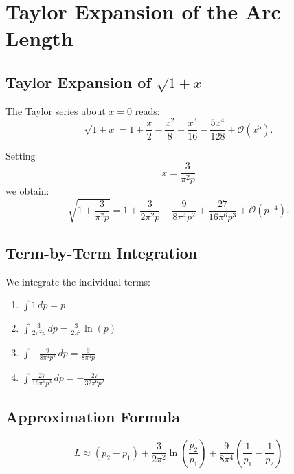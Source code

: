 \chapter{Taylor Expansion of the Arc Length}\label{ch:taylor}


\section{Taylor Expansion of \texorpdfstring{$\sqrt{1+x}$}{sqrt(1+x)}}

The Taylor series about $x=0$ reads:
\begin{equation}
\sqrt{1+x}
= 1 + \frac{x}{2} - \frac{x^2}{8} + \frac{x^3}{16}
  - \frac{5x^4}{128} + \mathcal{O}(x^5).
\end{equation}

Setting
\[
x = \frac{3}{\pi^2 p}
\]
we obtain:
\begin{equation}
\sqrt{1 + \frac{3}{\pi^2 p}}
= 1
+ \frac{3}{2\pi^2 p}
- \frac{9}{8\pi^4 p^2}
+ \frac{27}{16\pi^6 p^3}
+ \mathcal{O}(p^{-4}).
\end{equation}

\section{Term-by-Term Integration}

We integrate the individual terms:
\begin{enumerate}
\item $\displaystyle \int 1\, dp = p$
\item $\displaystyle \int \frac{3}{2\pi^2 p}\, dp
= \frac{3}{2\pi^2}\ln(p)$
\item $\displaystyle \int -\frac{9}{8\pi^4 p^2}\, dp
= \frac{9}{8\pi^4 p}$
\item $\displaystyle \int \frac{27}{16\pi^6 p^3}\, dp
= -\frac{27}{32\pi^6 p^2}$
\end{enumerate}

\section{Approximation Formula}

\begin{theorem}\label{thm:taylor-arc-length}
\begin{equation}
\boxed{
L \approx (p_2 - p_1)
+ \frac{3}{2\pi^2}\ln\!\left(\frac{p_2}{p_1}\right)
+ \frac{9}{8\pi^4}\left(\frac{1}{p_1} - \frac{1}{p_2}\right)
}
\end{equation}
\end{theorem}

